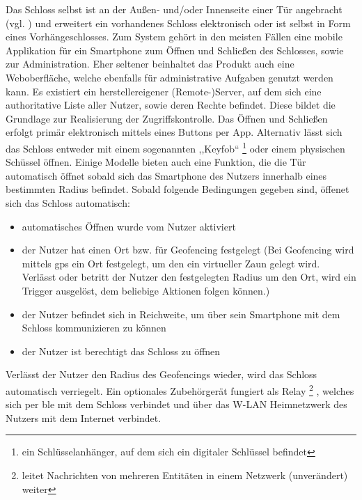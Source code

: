 	    \noindent Das Schloss selbst ist an der Außen- und/oder Innenseite einer Tür angebracht (vgl. ) und erweitert ein vorhandenes Schloss elektronisch oder ist selbst in Form eines Vorhängeschlosses\cite{Ho2016}. 
		Zum System gehört in den meisten Fällen eine mobile Applikation für ein Smartphone zum Öffnen und Schließen des Schlosses, sowie zur Administration\cite{Fuller2017}. 
        Eher seltener beinhaltet das Produkt auch eine Weboberfläche, welche ebenfalls für administrative Aufgaben genutzt werden kann\cite{Ho2016}. 
		Es existiert ein herstellereigener (Remote-)Server, auf dem sich eine authoritative Liste aller Nutzer, sowie deren Rechte befindet. 
        Diese bildet die Grundlage zur Realisierung der Zugriffskontrolle.\cite{Fuller2017} 
        Das Öffnen und Schließen erfolgt primär elektronisch mittels eines Buttons per App.
        Alternativ lässt sich das Schloss entweder mit einem sogenannten ,,Keyfob`` 
        \footnote{ein Schlüsselanhänger, auf dem sich ein digitaler Schlüssel befindet} 
        oder einem physischen Schüssel öffnen\cite{Ho2016}. 
        Einige Modelle bieten auch eine Funktion, die die Tür automatisch öffnet sobald sich das Smartphone des Nutzers innerhalb eines bestimmten Radius befindet. 
        Sobald folgende Bedingungen gegeben sind, öffenet sich das Schloss automatisch:
        \begin{itemize}[noitemsep]
        	\item automatisches Öffnen wurde vom Nutzer aktiviert
        	\item der Nutzer hat einen Ort bzw. für Geofencing festgelegt (Bei Geofencing wird mittels \gls{gps} ein Ort festgelegt, um den ein virtueller Zaun gelegt wird. Verlässt oder betritt der Nutzer den festgelegten Radius um den Ort, wird ein Trigger ausgelöst, dem beliebige Aktionen folgen können.)
        	\item der Nutzer befindet sich in Reichweite, um über sein Smartphone mit dem Schloss kommunizieren zu können
        	\item der Nutzer ist berechtigt das Schloss zu öffnen
        \end{itemize}
    	Verlässt der Nutzer den Radius des Geofencings wieder, wird das Schloss automatisch verriegelt.
		Ein optionales Zubehörgerät fungiert als Relay
		\footnote{leitet Nachrichten von mehreren Entitäten in einem Netzwerk (unverändert) weiter}
		, welches sich per \gls{ble} mit dem Schloss verbindet und über das W-LAN Heimnetzwerk des Nutzers mit dem Internet verbindet.
		
